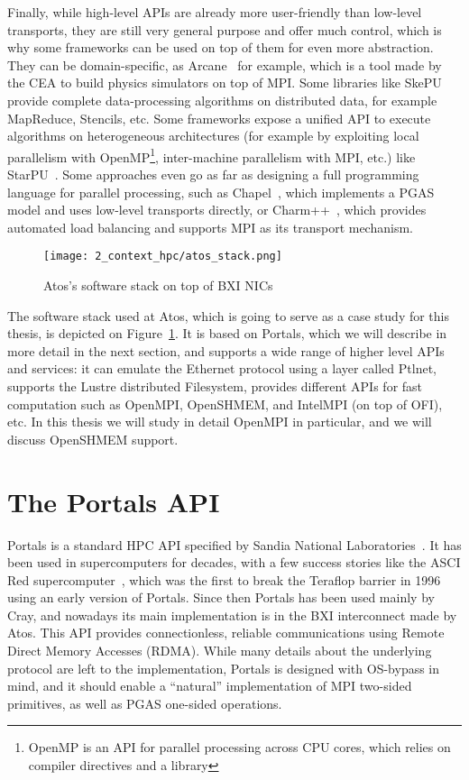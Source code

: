 Finally, while high-level APIs are already more user-friendly than low-level
transports, they are still very general purpose and offer much control, which is
why some frameworks can be used on top of them for even more abstraction. They
can be domain-specific, as Arcane~\cite{Grospellier2009} for example, which is a
tool made by the CEA to build physics simulators on top of MPI. Some libraries
like SkePU~\cite{Enmyren2010} provide complete data-processing algorithms on
distributed data, for example MapReduce, Stencils, etc. Some frameworks expose a
unified API to execute algorithms on heterogeneous architectures (for example by
exploiting local parallelism with OpenMP\footnote{OpenMP is an API for parallel
processing across CPU cores, which relies on compiler directives and a library},
inter-machine parallelism with MPI, etc.) like StarPU~\cite{Augonnet2011}. Some
approaches even go as far as designing a full programming language for parallel
processing, such as Chapel~\cite{Parenteau2021}, which implements a PGAS model
and uses low-level transports directly, or Charm++~\cite{Kale1993}, which
provides automated load balancing and supports MPI as its transport mechanism.

\begin{figure}[!ht]
    \centering
    \texttt{[image: 2\_context\_hpc/atos\_stack.png]}
    \caption{Atos's software stack on top of BXI NICs}
    \label{fig:2_context_hpc:AtosSoftwareStack}
\end{figure}

The software stack used at Atos, which is going to serve as a case study for
this thesis, is depicted on Figure~\ref{fig:2_context_hpc:AtosSoftwareStack}. It
is based on Portals, which we will describe in more detail in the next section,
and supports a wide range of higher level APIs and services: it can emulate the
Ethernet protocol using a layer called Ptlnet, supports the Lustre distributed
Filesystem, provides different APIs for fast computation such as OpenMPI,
OpenSHMEM, and IntelMPI (on top of OFI), etc. In this thesis we will study in
detail OpenMPI in particular, and we will discuss OpenSHMEM support.

\section{The Portals API}

Portals is a standard HPC API specified by Sandia National
Laboratories~\cite{Brightwell2022}. It has been used in supercomputers for
decades, with a few success stories like the ASCI Red
supercomputer~\cite{Mattson1998}, which was the first to break the Teraflop
barrier in 1996 using an early version of Portals. Since then Portals has been
used mainly by Cray, and nowadays its main implementation is in the BXI
interconnect made by Atos. This API provides connectionless, reliable
communications using Remote Direct Memory Accesses (RDMA). While many details
about the underlying protocol are left to the implementation, Portals is
designed with OS-bypass in mind, and it should enable a ``natural''
implementation of MPI two-sided primitives, as well as PGAS one-sided
operations.

